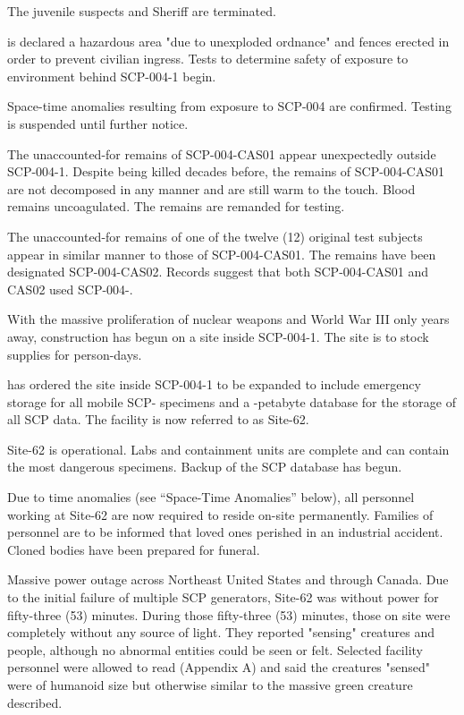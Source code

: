  The juvenile suspects and Sheriff   are terminated.

  is declared a hazardous area "due to unexploded ordnance" and fences erected in order to prevent civilian ingress. Tests to determine safety of exposure to environment behind SCP-004-1 begin.

 Space-time anomalies resulting from exposure to SCP-004 are confirmed. Testing is suspended until further notice.

 The unaccounted-for remains of SCP-004-CAS01 appear unexpectedly outside SCP-004-1. Despite being killed decades before, the remains of SCP-004-CAS01 are not decomposed in any manner and are still warm to the touch. Blood remains uncoagulated. The remains are remanded for testing.

 The unaccounted-for remains of one of the twelve (12) original test subjects appear in similar manner to those of SCP-004-CAS01. The remains have been designated SCP-004-CAS02. Records suggest that both SCP-004-CAS01 and CAS02 used SCP-004-.

 With the massive proliferation of nuclear weapons and World War III only  years away, construction has begun on a site inside SCP-004-1. The site is to stock supplies for  person-days.

  has ordered the site inside SCP-004-1 to be expanded to include emergency storage for all mobile SCP- specimens and a -petabyte database for the storage of all SCP data. The facility is now referred to as Site-62.

 Site-62 is operational. Labs and containment units are complete and can contain the most dangerous specimens. Backup of the SCP database has begun.

 Due to time anomalies (see “Space-Time Anomalies” below), all personnel working at Site-62 are now required to reside on-site permanently. Families of personnel are to be informed that loved ones perished in an industrial accident. Cloned bodies have been prepared for funeral.

 Massive power outage across Northeast United States and through Canada. Due to the initial failure of multiple SCP generators, Site-62 was without power for fifty-three (53) minutes. During those fifty-three (53) minutes, those on site were completely without any source of light. They reported "sensing" creatures and people, although no abnormal entities could be seen or felt. Selected facility personnel were allowed to read  (Appendix A) and said the creatures "sensed" were of humanoid size but otherwise similar to the massive green creature described.

